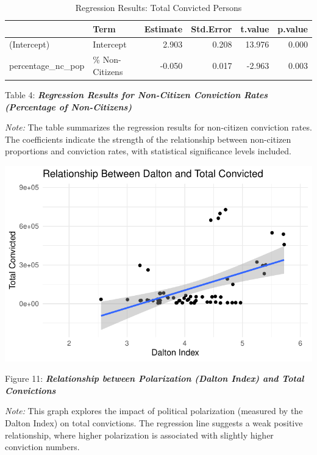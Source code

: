 \documentclass[
]{article}
\begin{document}
\begin{table}
\centering
\caption{Regression Results: Total Convicted Persons}
\centering
\begin{tabular}[t]{l|l|r|r|r|r}
\hline
  & Term & Estimate & Std.Error & t.value & p.value\\
\hline
(Intercept) & Intercept & 2.903 & 0.208 & 13.976 & 0.000\\
\hline
percentage\_nc\_pop & \% Non-Citizens & -0.050 & 0.017 & -2.963 & 0.003\\
\hline
\end{tabular}
\end{table}

Table 4: \textbf{\emph{Regression Results for Non-Citizen Conviction
Rates (Percentage of Non-Citizens)}}

\emph{Note:} The table summarizes the regression results for non-citizen
conviction rates. The coefficients indicate the strength of the
relationship between non-citizen proportions and conviction rates, with
statistical significance levels included.

\includegraphics{DataMan_Project_files/figure-pdf/unnamed-chunk-39-1.pdf}

Figure 11: \textbf{\emph{Relationship between Polarization (Dalton
Index) and Total Convictions}}

\emph{Note:} This graph explores the impact of political polarization
(measured by the Dalton Index) on total convictions. The regression line
suggests a weak positive relationship, where higher polarization is
associated with slightly higher conviction numbers.
\end{document}
